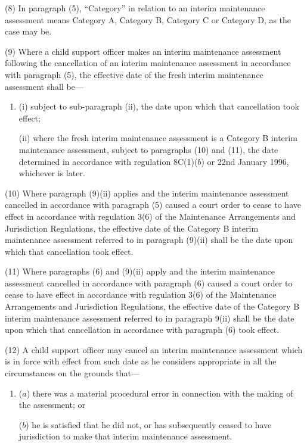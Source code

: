 \documentclass[a4paper]{article}
\begin{document}
(8) In paragraph (5), “Category” in relation to an interim maintenance assessment means Category A, Category B, Category C or Category D, as the case may be.

(9) Where a child support officer makes an interim maintenance assessment following the cancellation of an interim maintenance assessment in accordance with paragraph (5), the effective date of the fresh interim maintenance assessment shall be—
\begin{enumerate}\item[]
(i) subject to sub-paragraph (ii), the date upon which that cancellation took effect;

(ii) where the fresh interim maintenance assessment is a Category B interim maintenance assessment, subject to paragraphs (10) and (11), the date determined in accordance with regulation 8C(1)($b$) or 22nd January 1996, whichever is later.
\end{enumerate}

(10) Where paragraph (9)(ii) applies and the interim maintenance assessment cancelled in accordance with paragraph (5) caused a court order to cease to have effect in accordance with regulation 3(6) of the Maintenance Arrangements and Jurisdiction Regulations, the effective date of the Category B interim maintenance assessment referred to in paragraph (9)(ii) shall be the date upon which that cancellation took effect.

(11) Where paragraphs (6) and (9)(ii) apply and the interim maintenance assessment cancelled in accordance with paragraph (6) caused a court order to cease to have effect in accordance with regulation 3(6) of the Maintenance Arrangements and Jurisdiction Regulations, the effective date of the Category B interim maintenance assessment referred to in paragraph 9(ii) shall be the date upon which that cancellation in accordance with paragraph (6) took effect.

(12) A child support officer may cancel an interim maintenance assessment which is in force with effect from such date as he considers appropriate in all the circumstances on the grounds that—
\begin{enumerate}\item[]
($a$) there was a material procedural error in connection with the making of the assessment; or

($b$) he is satisfied that he did not, or has subsequently ceased to have jurisdiction to make that interim maintenance assessment.
\end{enumerate}
\end{document}
